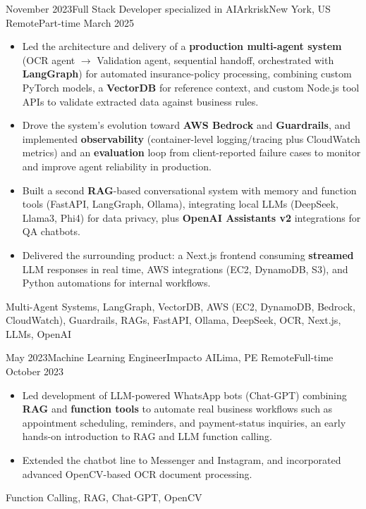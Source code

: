\begin{experiences}
\emptySeparator
\experience
  {November 2023}{Full Stack Developer specialized in AI}{Arkrisk}{New York, US}
  {Remote}{Part-time}
  {March 2025} {
    \begin{itemize}
      \item Led the architecture and delivery of a \textbf{production multi-agent system} (OCR agent \(\to\) Validation agent, sequential handoff, orchestrated with \textbf{LangGraph}) for automated insurance-policy processing, combining custom PyTorch models, a \textbf{VectorDB} for reference context, and custom Node.js tool APIs to validate extracted data against business rules.
      \item Drove the system's evolution toward \textbf{AWS Bedrock} and \textbf{Guardrails}, and implemented \textbf{observability} (container-level logging/tracing plus CloudWatch metrics) and an \textbf{evaluation} loop from client-reported failure cases to monitor and improve agent reliability in production.
      \item Built a second \textbf{RAG}-based conversational system with memory and function tools (FastAPI, LangGraph, Ollama), integrating local LLMs (DeepSeek, Llama3, Phi4) for data privacy, plus \textbf{OpenAI Assistants v2} integrations for QA chatbots.
      \item Delivered the surrounding product: a Next.js frontend consuming \textbf{streamed} LLM responses in real time, AWS integrations (EC2, DynamoDB, S3), and Python automations for internal workflows.
    \end{itemize}
  }
  {{Multi-Agent Systems}, LangGraph, VectorDB, {AWS (EC2, DynamoDB, Bedrock, CloudWatch)}, Guardrails, RAGs, FastAPI, Ollama, DeepSeek, OCR, Next.js, LLMs, OpenAI}

\emptySeparator
\experience
  {May 2023}{Machine Learning Engineer}{Impacto AI}{Lima, PE}
  {Remote}{Full-time}
  {October 2023} {
    \begin{itemize}
      \item Led development of LLM-powered WhatsApp bots (Chat-GPT) combining \textbf{RAG} and \textbf{function tools} to automate real business workflows such as appointment scheduling, reminders, and payment-status inquiries, an early hands-on introduction to RAG and LLM function calling.
      \item Extended the chatbot line to Messenger and Instagram, and incorporated advanced OpenCV-based OCR document processing.
    \end{itemize}
  }
  {{Function Calling}, RAG, Chat-GPT, OpenCV}


\end{experiences}
